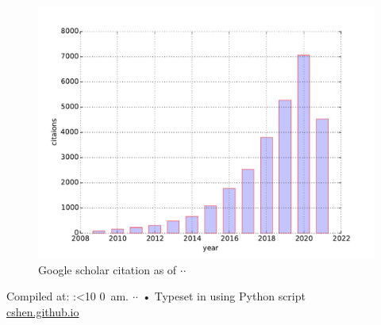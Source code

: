 \documentclass[9pt, a4paper]{article}
\newif\iftimePM
\def\now{\number\timehh:\ifnum\timemm<10 0\fi\number\timemm
         \iftimePM {$\,$pm.}  \else {$\,$am.}  \fi}
\edef\today{\number\day$\cdot$\number\month$\cdot$\number\year}
\begin{document}
\begin{figure}[h!]
\centering
\includegraphics[width=.605\textwidth]{../data/cs_cite}
\caption{Google scholar citation as of \today}
\label{fig:google_scholar}
\end{figure}








\vfill{}
\begin{center}
{\scriptsize    Compiled at: \now \today\- •\- Typeset in {
\XeLaTeX{}
using Python script
}\\
\href{https://cshen.github.io}{cshen.github.io}
}
\end{center}
\end{document}
